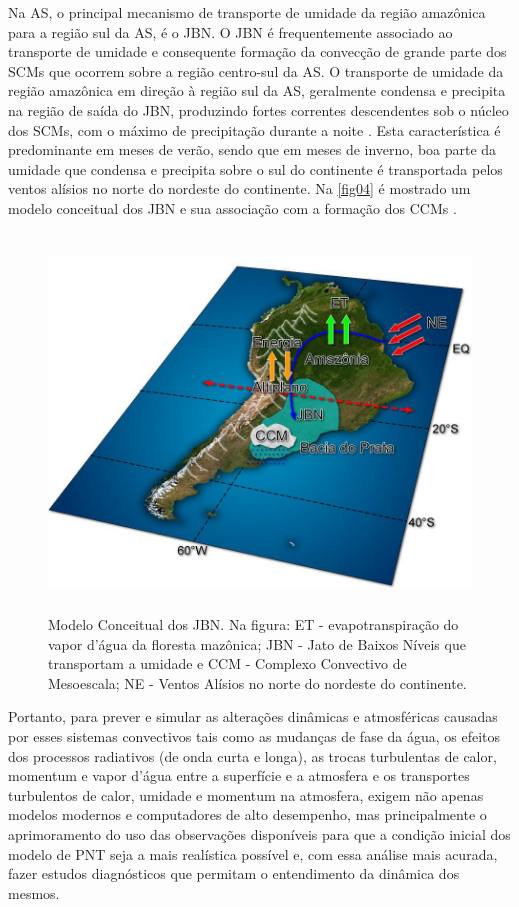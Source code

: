 Na AS, o principal mecanismo de transporte de umidade da região amazônica para a região sul da AS, é o JBN. O JBN é frequentemente associado ao transporte de umidade e consequente formação da convecção de grande parte dos SCMs \cite{ferreiraetal03} que ocorrem sobre a região centro-sul da AS. O transporte de umidade da região amazônica em direção à região sul da AS, geralmente condensa e precipita na região de saída do JBN, produzindo fortes correntes descendentes sob o núcleo dos SCMs, com o máximo de precipitação durante a noite \cite{noguesetal00}. Esta característica é predominante em meses de verão, sendo que em meses de inverno, boa parte da umidade que condensa e precipita sobre o sul do continente é transportada pelos ventos alísios no norte do nordeste do continente. Na \autoref{fig04} é mostrado um modelo conceitual dos JBN e sua associação com a formação dos CCMs \cite{marengoetal04}.

\begin{figure}
\includegraphics[height=10cm]{./figs/fig10.png}
\caption{Modelo Conceitual dos JBN. Na figura: ET - evapotranspiração do vapor d'água da floresta mazônica; JBN - Jato de Baixos Níveis que transportam a umidade e CCM - Complexo Convectivo de Mesoescala; NE - Ventos Alísios no norte do nordeste do continente.}
\label{fig04}
\end{figure}

Portanto, para prever e simular as alterações dinâmicas e atmosféricas causadas por esses sistemas convectivos tais como as mudanças de fase da água, os efeitos dos processos radiativos (de onda curta e longa), as trocas turbulentas de calor, momentum e vapor d'água entre a superfície e a atmosfera e os transportes turbulentos de calor, umidade e momentum na atmosfera, exigem não apenas modelos modernos e computadores de alto desempenho, mas principalmente o aprimoramento do uso das observações disponíveis para que a condição inicial dos modelo de PNT seja a mais realística possível e, com essa análise mais acurada, fazer estudos diagnósticos que permitam o entendimento da dinâmica dos mesmos.

